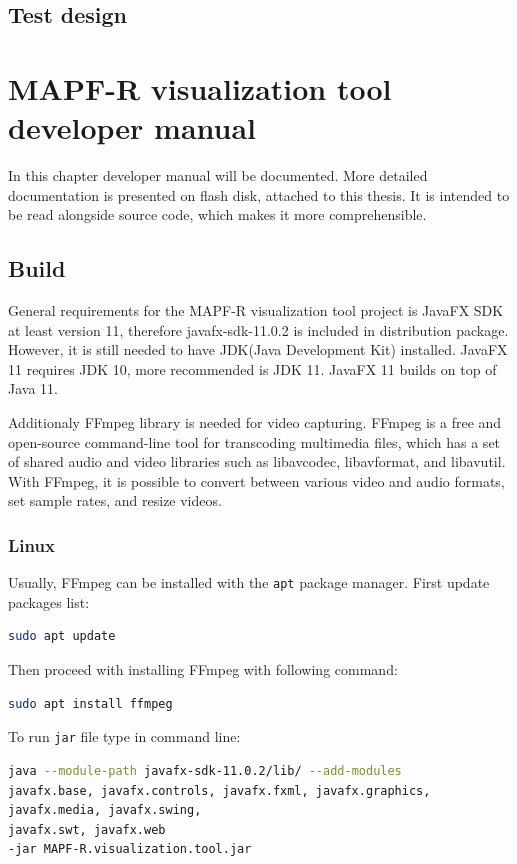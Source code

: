 \documentclass[thesis=B,english]{FITthesis}[2019/12/23]
\begin{document}
\section{Test design}

\chapter{MAPF-R visualization tool developer manual}

In this chapter developer manual will be documented. More detailed documentation is presented on flash disk, attached to this thesis. It is intended to be read alongside source code, which makes it more comprehensible.

\section{Build}
 
General requirements for the MAPF-R visualization tool project is JavaFX SDK at least version 11, therefore javafx-sdk-11.0.2 is included in distribution package. However, it is still needed to have JDK(Java Development Kit) installed. JavaFX 11 requires JDK 10, more recommended is JDK 11. JavaFX 11 builds on top of Java 11.

Additionaly FFmpeg library is needed for video capturing. FFmpeg is a free and open-source command-line tool for transcoding multimedia files, which has a set of shared audio and video libraries such as libavcodec, libavformat, and libavutil. With FFmpeg, it is possible to convert between various video and audio formats, set sample rates, and resize videos.

\subsection{Linux}

Usually, FFmpeg can be installed with the \verb|apt| package manager. First update packages list:
\begin{lstlisting}[language=bash]
sudo apt update
\end{lstlisting}
Then proceed with installing FFmpeg with following command:
\begin{lstlisting}[language=bash]
sudo apt install ffmpeg
\end{lstlisting}

To run \verb|jar| file type in command line:
\begin{lstlisting}[language=bash]
java --module-path javafx-sdk-11.0.2/lib/ --add-modules 
javafx.base, javafx.controls, javafx.fxml, javafx.graphics, 
javafx.media, javafx.swing, 
javafx.swt, javafx.web
-jar MAPF-R.visualization.tool.jar
\end{lstlisting}
\end{document}
